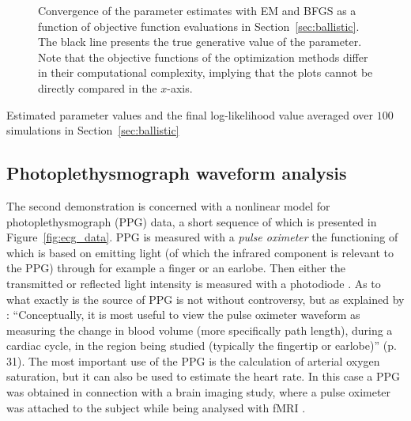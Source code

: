 \begin{figure}[htbp]
{\begin{subfigure}[b]{0.5\textwidth+0.4in}
    \end{subfigure}}%
    \caption{Convergence of the parameter estimates with EM and BFGS
    as a function of objective function evaluations in Section~\ref{sec:ballistic}. The black line
    presents the true generative value of the parameter.
    Note that the
    objective functions of the optimization methods differ in their computational complexity, 
    implying that the plots cannot be directly compared in the $x$-axis. }\label{fig:ballistic_est}
 \end{figure}
 
\begin{table}[htbp]
	\caption{Estimated parameter values and the final
	log-likelihood value 
	averaged over $100$ simulations in Section~\ref{sec:ballistic}}
	\label{table:ballistic_restults}
	\centering
	\footnotesize
	
\end{table} 


\clearpage



\subsection{Photoplethysmograph waveform analysis}\label{sec:harmonic}

The second demonstration is concerned with a nonlinear model for
photoplethysmograph (PPG) data, a short sequence of which is presented
in Figure~\ref{fig:ecg_data}. PPG is measured with 
a \emph{pulse oximeter} the functioning of which is based on
emitting light (of which the infrared component is relevant to the PPG)
through for example a finger or an earlobe. Then either the transmitted
or reflected light intensity is measured with a photodiode \parencite{Shelley2007}. 
As to what exactly is the source of PPG is not without controversy,
but as explained by \textcite{Shelley2007}:
``Conceptually, it is most useful to view the pulse
oximeter waveform as measuring the change in blood
volume (more specifically path length), during a cardiac cycle, 
in the region being studied (typically the fingertip or earlobe)'' (p. 31).
The most important use of the PPG is the calculation of arterial oxygen
saturation, but it can also be used to estimate the heart rate.
In this case a PPG was obtained in connection with a brain imaging study, where
a pulse oximeter was attached to the subject while being analysed with fMRI \parencite{Sarkka2012}.   

